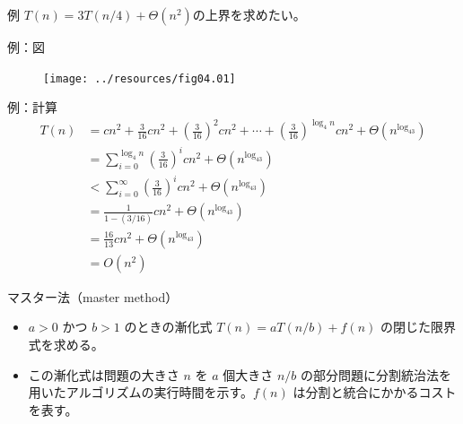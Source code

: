 \documentclass[unicode,11pt,aspectratio=169,notes]{beamer} %
\begin{document}
\begin{frame}{例}
  $T(n)=3T(n/4)+\Theta(n^2)$の上界を求めたい。
\end{frame}

\begin{frame}{例：図}
  \begin{figure}
    \texttt{[image: ../resources/fig04.01]}
  \end{figure}
\end{frame}

\begin{frame}{例：計算}
  \begin{align*}
    T(n) & = cn^2 + \frac{3}{16}cn^2 + \left(\frac{3}{16}\right)^2cn^2 + \cdots
             + \left(\frac{3}{16}\right)^{\log_4n}cn^2 + \Theta(n^{\log_43}) \\
         & = \sum_{i=0}^{\log_4n}\left(\frac{3}{16}\right)^icn^2
             + \Theta(n^{\log_43}) \\
         & < \sum_{i=0}^{\infty}\left(\frac{3}{16}\right)^icn^2
             + \Theta(n^{\log_43}) \\
         & = \frac{1}{1-(3/16)}cn^2+\Theta(n^{\log_43}) \\
         & = \frac{16}{13}cn^2+\Theta(n^{\log_43}) \\
         & = O(n^2)
  \end{align*}
\end{frame}

\begin{frame}{マスター法（master method）}
  \begin{itemize}
    \item $a>0$ かつ $b>1$ のときの漸化式 $T(n) = aT(n/b)+f(n)$ の閉じた限界式を求める。
    \item この漸化式は問題の大きさ $n$ を $a$ 個大きさ $n/b$ の部分問題に分割統治法を
    用いたアルゴリズムの実行時間を示す。$f(n)$ は分割と統合にかかるコストを表す。
  \end{itemize}
\end{frame}
\end{document}
